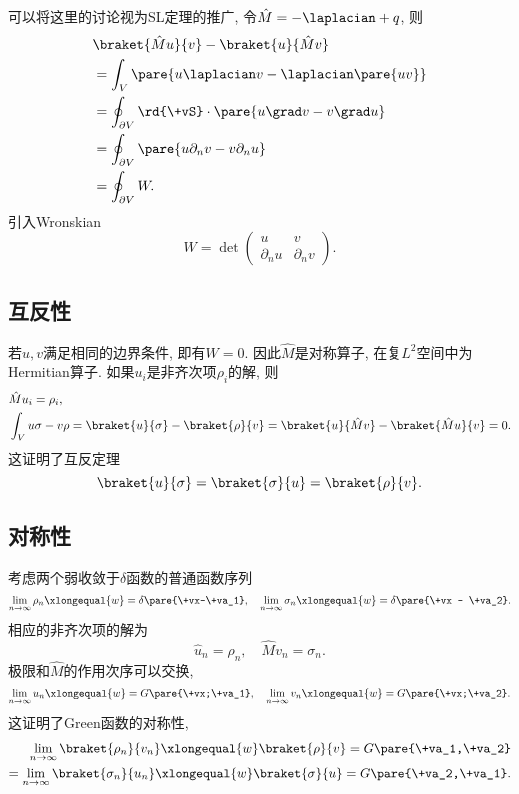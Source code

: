 \documentclass[hidelinks]{ctexart}
\begin{document}
\newpoint{}可以将这里的讨论视为SL定理的推广, 令$\hat M = -\laplacian + q$, 则
\begin{align*}
    & \braket{\hat M u}{v} - \braket{u}{\hat M v} \\
    &= \int_V \pare{u\laplacian v - \laplacian\pare{uv}} \\
    &= \oint_{\partial V}\rd{\+vS}\cdot \pare{u\grad v - v\grad u} \\
    &= \oint_{\partial V} \pare{u\partial_n v - v\partial_n u} \\
    &= \oint_{\partial V} W.
\end{align*}
\newpoint{}引入Wronskian
\[ W = \det \begin{pmatrix}
    u & v \\
    \partial_n u & \partial_n v
\end{pmatrix}. \]


\subsection{互反性} %
\label{sub:互反性}

\newpoint{}若$u,v$满足相同的边界条件, 即有$W = 0$. 因此$\hat M$是对称算子, 在复$L^2$空间中为Hermitian算子. 如果$u_i$是非齐次项$\rho_i$的解, 则
\begin{align*}
    & \hat M u_i = \rho_i, \\
    & \int_V u\sigma - v\rho = \braket{u}{\sigma} - \braket{\rho}{v} = \braket{u}{\hat M v} - \braket{\hat Mu}{v} = 0.
\end{align*}
\newpoint{}这证明了互反定理
\[ \braket{u}{\sigma} = \braket{\sigma}{u} = \braket{\rho}{v}. \]


\subsection{对称性} %
\label{sub:对称性}

\newpoint{}考虑两个弱收敛于$\delta$函数的普通函数序列
\[ \lim_{n\rightarrow \infty} \rho_n \xlongequal{w} = \delta\pare{\+vx-\+va_1},\quad \lim_{n\rightarrow \infty}\sigma_n \xlongequal{w} = \delta\pare{\+vx - \+va_2}. \]
相应的非齐次项的解为
\[ \hat u_n = \rho_n,\quad \hat M v_n = \sigma_n. \]
\newpoint{}极限和$\hat M$的作用次序可以交换,
\[ \lim_{n\rightarrow \infty} u_n \xlongequal{w} = G\pare{\+vx;\+va_1},\quad \lim_{n\rightarrow \infty}v_n \xlongequal{w} = G\pare{\+vx;\+va_2}. \]
\newpoint{}这证明了Green函数的对称性,
\begin{align*}
    \lim_{n\rightarrow \infty}\braket{\rho_n}{v_n} \xlongequal{w} \braket{\rho}{v} = G\pare{\+va_1,\+va_2} \\
    =\lim_{n\rightarrow \infty}\braket{\sigma_n}{u_n} \xlongequal{w} \braket{\sigma}{u} = G\pare{\+va_2,\+va_1}.
\end{align*}
\end{document}
